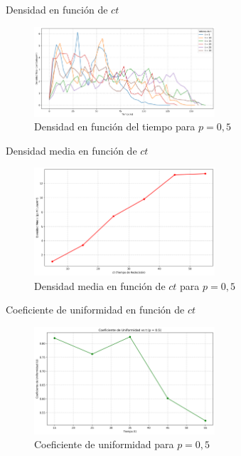 \documentclass[aspectratio=169]{beamer}
\begin{document}
\begin{frame}{Densidad en función de $ct$}
    \begin{figure}[H]
        \centering
        \includegraphics[width=0.6\textwidth]{img/density_vs_time_p0.50.png}
        \caption{Densidad en función del tiempo para $p=0,5$}
        \label{fig:flow_p100}
    \end{figure}    
\end{frame}

\begin{frame}{Densidad media en función de $ct$}
    \begin{figure}[H]
        \centering
        \includegraphics[width=0.6\textwidth]{img/average_density_p0.50.png}
        \caption{Densidad media en función de $ct$ para $p=0,5$}
        \label{fig:flow_p100}
    \end{figure}    
\end{frame}


\begin{frame}{Coeficiente de uniformidad en función de $ct$}
    \begin{figure}[H]
        \centering
        \includegraphics[width=0.6\textwidth]{img/uniformity_vs_t_p0.5.png}
        \caption{Coeficiente de uniformidad para $p=0,5$}
        \label{fig:flow_p100}
    \end{figure}    
\end{frame}
\end{document}
